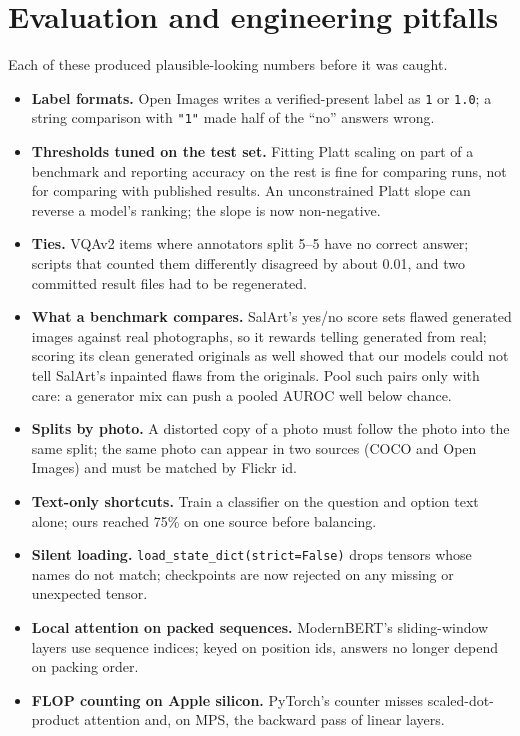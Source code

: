 \documentclass[10pt]{article}
\begin{document}



\appendix
\section{Evaluation and engineering pitfalls}\label{app:pitfalls}
Each of these produced plausible-looking numbers before it was caught.
\begin{itemize}\setlength\itemsep{1pt}
\item \textbf{Label formats.} Open Images writes a verified-present label as \texttt{1} or \texttt{1.0}; a string comparison with \texttt{"1"} made half of the ``no'' answers wrong.
\item \textbf{Thresholds tuned on the test set.} Fitting Platt scaling on part of a benchmark and reporting accuracy on the rest is fine for comparing runs, not for comparing with published results. An unconstrained Platt slope can reverse a model's ranking; the slope is now non-negative.
\item \textbf{Ties.} VQAv2 items where annotators split 5--5 have no correct answer; scripts that counted them differently disagreed by about 0.01, and two committed result files had to be regenerated.
\item \textbf{What a benchmark compares.} SalArt's yes/no score sets flawed generated images against real photographs, so it rewards telling generated from real; scoring its clean generated originals as well showed that our models could not tell SalArt's inpainted flaws from the originals. Pool such pairs only with care: a generator mix can push a pooled AUROC well below chance.
\item \textbf{Splits by photo.} A distorted copy of a photo must follow the photo into the same split; the same photo can appear in two sources (COCO and Open Images) and must be matched by Flickr id.
\item \textbf{Text-only shortcuts.} Train a classifier on the question and option text alone; ours reached 75\% on one source before balancing.
\item \textbf{Silent loading.} \texttt{load\_state\_dict(strict=False)} drops tensors whose names do not match; checkpoints are now rejected on any missing or unexpected tensor.
\item \textbf{Local attention on packed sequences.} ModernBERT's sliding-window layers use sequence indices; keyed on position ids, answers no longer depend on packing order.
\item \textbf{FLOP counting on Apple silicon.} PyTorch's counter misses scaled-dot-product attention and, on MPS, the backward pass of linear layers.

\end{itemize}
\end{document}
